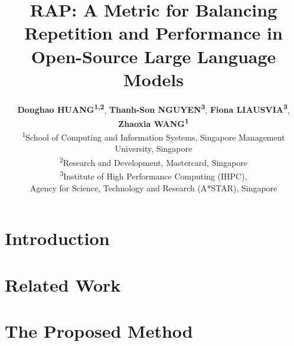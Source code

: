\documentclass[11pt]{article}
\title{RAP: A Metric for Balancing Repetition and Performance in \\Open-Source Large Language Models}
\author{
 \textbf{Donghao HUANG\textsuperscript{1,2}},
 \textbf{Thanh-Son NGUYEN\textsuperscript{3}},
 \textbf{Fiona LIAUSVIA\textsuperscript{3}},
 \textbf{Zhaoxia WANG\textsuperscript{1}}
\\
 \textsuperscript{1}School of Computing and Information Systems, 
  Singapore Management University, Singapore \\
\textsuperscript{2}Research and Development, Mastercard, Singapore \\
\textsuperscript{3}Institute of High Performance Computing (IHPC), \\Agency for Science, Technology and Research (A*STAR), Singapore\\
}
\newcommand{\rap}{RAP\xspace}
\newcommand{\todo}[1]{\textcolor{red}{(#1)}}
\begin{document}
\maketitle

\begin{abstract}

\end{abstract}





\section{Introduction}


\section{Related Work}


\section{The Proposed Method}
\label{sec:method}

\end{document}
